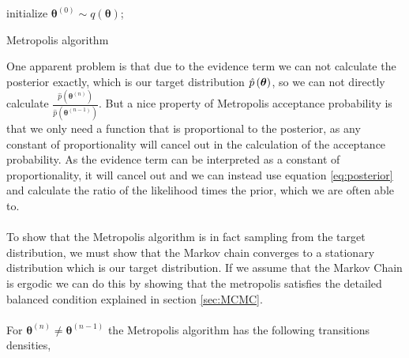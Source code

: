 \begin{algorithm}\label{algo_2}

\SetAlgoLined
{}
initialize $\boldsymbol{\theta}^{(0)}\sim q(\boldsymbol{\theta})$;

\caption{Metropolis algorithm}
\end{algorithm}
One apparent problem is that due to the evidence term we can not calculate the posterior exactly, which is our target distribution $\hat{p}\left (\boldsymbol{\theta}\right)$, so we can not directly calculate $\frac{\hat{p}(\boldsymbol{\theta}^{(n)})}{\hat{p}\left(\boldsymbol{\theta}^{(n-1)}\right)}$. 
But a nice property of Metropolis acceptance probability is that we only need a function that is proportional to the posterior, as any constant of proportionality will cancel out in the calculation of the acceptance probability. As the evidence term can be interpreted as a constant of proportionality, it will cancel out and we can instead use equation \ref{eq:posterior} and calculate the ratio of the likelihood times the prior, which we are often able to.   
\\
\\
To show that the Metropolis algorithm is in fact sampling from the target distribution, we must show that the Markov chain converges to a stationary distribution which is our target distribution. If we assume that the Markov Chain is ergodic we can do this by showing that the metropolis satisfies the detailed balanced condition explained in section \ref{sec:MCMC}.\\
\\
For $\boldsymbol{\theta}^{(n)}\neq \boldsymbol{\theta}^{(n-1)}$ the Metropolis algorithm has the following transitions densities,

